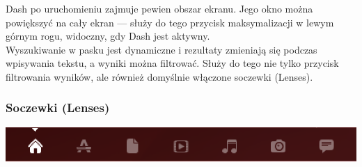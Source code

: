 Dash po uruchomieniu zajmuje pewien obszar ekranu. Jego okno można powiększyć na cały ekran --- służy do tego przycisk maksymalizacji w lewym górnym rogu, widoczny, gdy Dash jest aktywny.\\
Wyszukiwanie w pasku jest dynamiczne i rezultaty zmieniają się podczas wpisywania tekstu, a wyniki można filtrować. Służy do tego nie tylko przycisk filtrowania wyników, ale również domyślnie włączone soczewki (Lenses).

\subsubsection{Soczewki (Lenses)}
\begin{center}
	\includegraphics[width=\linewidth]{images/unity_dash_lenses.png}
\end{center}


